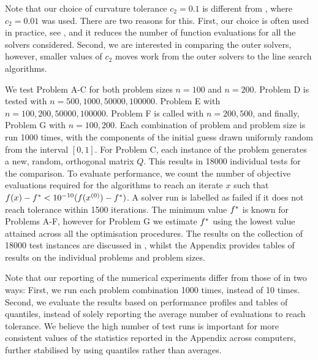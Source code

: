 \documentclass[main.tex]{subfiles}
\begin{document}
Note that our choice of curvature tolerance $c_2=0.1$ is different
from \citet{sterck2013steepest}, where $c_2=0.01$ was used. There are
two reasons for this.  First, our choice is often used in practice,
see \citet[Ch.~3.1]{nocedal2006numerical}, and it reduces the number
of function evaluations for all the solvers considered.  Second, we
are interested in comparing the outer solvers, however, smaller values
of $c_2$ moves work from the outer solvers to the line search
algorithms.

We test Problem A-C for both problem sizes $n=100$ and $n=200$.
Problem D is tested with
$n=\num{500},\num{1000},\num{50000},\num{100000}$.  Problem E with
$n=\num{100},\num{200},\num{50000},\num{100000}$.  Problem F is called
with $n=\num{200},\num{500}$, and finally, Problem G with
$n=\num{100},\num{200}$.  Each combination of problem and problem size
is run \num{1000} times, with the components of the initial guess
drawn uniformly random from the interval $[0,1]$. For Problem C, each
instance of the problem generates a new, random, orthogonal matrix
$Q$.  This results in \num{18000} individual tests for the comparison.
To evaluate performance, we count the number of objective evaluations
required for the algorithms to reach an iterate $x$ such that
$f(x)-f^* < 10^{-10}(f(x^{(0)})-f^*)$. A solver run is
labelled as failed if it does not reach tolerance within \num{1500}
iterations.  The minimum value $f^*$ is known for Problems A-F,
however for Problem G we estimate $f^*$ using the lowest value
attained across all the optimisation procedures.  The results on the
collection of \num{18000} test instances are discussed in
, whilst the Appendix provides tables of
results on the individual problems and problem sizes.

Note that our reporting of the numerical experiments differ from those
of \citet{sterck2013steepest} in two ways: First, we run each problem
combination \num{1000} times, instead of \num{10} times. Second, we
evaluate the results based on performance profiles and tables of
quantiles, instead of solely reporting the average number of
evaluations to reach tolerance.  We believe the high number of test
runs is important for more consistent values of the statistics
reported in the Appendix across computers, further stabilised by using
quantiles rather than averages.
\end{document}
